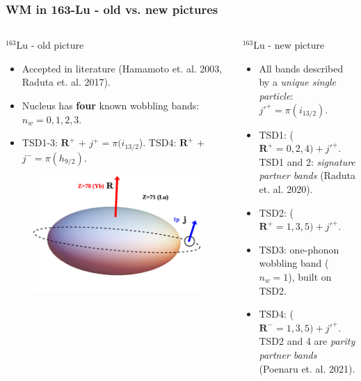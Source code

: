 \documentclass[
	11pt, %
]{beamer}
\begin{document}
\begin{frame}
	\frametitle{WM in 163-Lu - old vs. new pictures}
		\begin{columns}
			\begin{column}{0.5\textwidth}
				\vspace{-0.3cm}
				\begin{block}{$^{163}$Lu - old picture}
					\begin{itemize}
						\item Accepted in literature (Hamamoto et. al. 2003, Raduta et. al. 2017).
						\item Nucleus has \textbf{four} known wobbling bands: $n_w=0,1,2,3$.
						\item TSD1-3: $\mathbf{R}^+$ + $j^+=\pi(i_{13/2}$). TSD4: $\mathbf{R}^+$ + $j^-=\pi(h_{9/2})$.
					\end{itemize}
				\end{block}
				\begin{figure}
					\vspace{-0.4cm}
					\includegraphics[scale=0.12]{figures/triaxial-shapes-oddA-2.png}
				\end{figure}
			\end{column}
			\vspace{0.5cm}
			\begin{column}{0.5\textwidth}
				\begin{alertblock}{$^{163}$Lu - new picture}
					\begin{itemize}
						\item All bands described by a \emph{unique single particle}: $j'^+=\pi(i_{13/2})$.
						\item TSD1: ($\mathbf{R}^+=0,2,4)+j'^+$. TSD1 and 2: \emph{signature partner bands} (Raduta et. al. 2020).
						\item TSD2: ($\mathbf{R}^+=1,3,5)+j'^+$.
						\item TSD3: one-phonon wobbling band ($n_w=1$), built on TSD2.
						\item TSD4: ($\mathbf{R}^-=1,3,5)+j'^+$. TSD2 and 4 are \emph{parity partner bands} (Poenaru et. al. 2021).
					\end{itemize}
				\end{alertblock}
			\end{column}
		\end{columns}
\end{frame}
\end{document}
